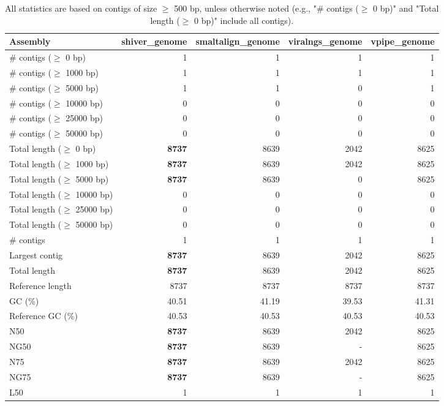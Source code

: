 \documentclass[12pt,a4paper]{article}
\begin{document}
\begin{table}[ht]
\begin{center}
\caption{All statistics are based on contigs of size $\geq$ 500 bp, unless otherwise noted (e.g., "\# contigs ($\geq$ 0 bp)" and "Total length ($\geq$ 0 bp)" include all contigs).}
\begin{tabular}{|l*{4}{|r}|}
\hline
Assembly & shiver\_genome & smaltalign\_genome & viralngs\_genome & vpipe\_genome \\ \hline
\# contigs ($\geq$ 0 bp) & 1 & 1 & 1 & 1 \\ \hline
\# contigs ($\geq$ 1000 bp) & 1 & 1 & 1 & 1 \\ \hline
\# contigs ($\geq$ 5000 bp) & 1 & 1 & 0 & 1 \\ \hline
\# contigs ($\geq$ 10000 bp) & 0 & 0 & 0 & 0 \\ \hline
\# contigs ($\geq$ 25000 bp) & 0 & 0 & 0 & 0 \\ \hline
\# contigs ($\geq$ 50000 bp) & 0 & 0 & 0 & 0 \\ \hline
Total length ($\geq$ 0 bp) & {\bf 8737} & 8639 & 2042 & 8625 \\ \hline
Total length ($\geq$ 1000 bp) & {\bf 8737} & 8639 & 2042 & 8625 \\ \hline
Total length ($\geq$ 5000 bp) & {\bf 8737} & 8639 & 0 & 8625 \\ \hline
Total length ($\geq$ 10000 bp) & 0 & 0 & 0 & 0 \\ \hline
Total length ($\geq$ 25000 bp) & 0 & 0 & 0 & 0 \\ \hline
Total length ($\geq$ 50000 bp) & 0 & 0 & 0 & 0 \\ \hline
\# contigs & 1 & 1 & 1 & 1 \\ \hline
Largest contig & {\bf 8737} & 8639 & 2042 & 8625 \\ \hline
Total length & {\bf 8737} & 8639 & 2042 & 8625 \\ \hline
Reference length & 8737 & 8737 & 8737 & 8737 \\ \hline
GC (\%) & 40.51 & 41.19 & 39.53 & 41.31 \\ \hline
Reference GC (\%) & 40.53 & 40.53 & 40.53 & 40.53 \\ \hline
N50 & {\bf 8737} & 8639 & 2042 & 8625 \\ \hline
NG50 & {\bf 8737} & 8639 & - & 8625 \\ \hline
N75 & {\bf 8737} & 8639 & 2042 & 8625 \\ \hline
NG75 & {\bf 8737} & 8639 & - & 8625 \\ \hline
L50 & 1 & 1 & 1 & 1 \\ \hline

\end{tabular}
\end{center}
\end{table}
\end{document}
